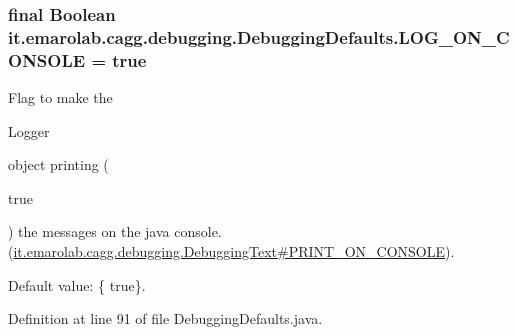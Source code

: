 \hypertarget{classit_1_1emarolab_1_1cagg_1_1debugging_1_1DebuggingDefaults_a367caf2dc8777f38b40c160b848cafe0}{
\subsubsection[{L\-O\-G\-\_\-\-O\-N\-\_\-\-C\-O\-N\-S\-O\-L\-E}]{\setlength{\rightskip}{0pt plus 5cm}final Boolean it.\-emarolab.\-cagg.\-debugging.\-Debugging\-Defaults.\-L\-O\-G\-\_\-\-O\-N\-\_\-\-C\-O\-N\-S\-O\-L\-E = true\hspace{0.3cm}{\ttfamily [static]}}}\label{classit_1_1emarolab_1_1cagg_1_1debugging_1_1DebuggingDefaults_a367caf2dc8777f38b40c160b848cafe0}
Flag to make the
\begin{DoxyCode}
Logger 
\end{DoxyCode}
 object printing (
\begin{DoxyCode}
\textcolor{keyword}{true} 
\end{DoxyCode}
 ) the messages on the java console. (\hyperlink{}{it.\-emarolab.\-cagg.\-debugging.\-Debugging\-Text\#\-P\-R\-I\-N\-T\-\_\-\-O\-N\-\_\-\-C\-O\-N\-S\-O\-L\-E}).\par
 Default value\-: \{ true\}. 

Definition at line 91 of file Debugging\-Defaults.\-java.


